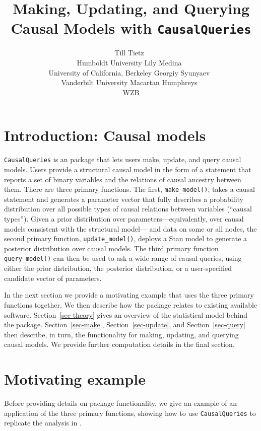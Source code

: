 \documentclass[
  11pt,
  article]{jss}
\author{Till Tietz~\orcidlink{0000-0002-2916-9059}\\Humboldt
University \And Lily Medina~\orcidlink{0009-0004-2423-524X}\\University
of California, Berkeley \AND Georgiy
Syunyaev~\orcidlink{0000-0002-4391-6313}\\Vanderbilt
University \And Macartan Humphreys~\orcidlink{0000-0001-7029-2326}\\WZB}
\title{Making, Updating, and Querying Causal Models with
\texttt{CausalQueries}}
\begin{document}
\maketitle

\section{Introduction: Causal models}\label{sec-intro}

\texttt{CausalQueries} is an  package that lets users make,
update, and query causal models. Users provide a structural causal model
in the form of a statement that reports a set of binary variables and
the relations of causal ancestry between them. There are three primary
functions. The first, \texttt{make\_model()}, takes a causal statement
and generates a parameter vector that fully describes a probability
distribution over all possible types of causal relations between
variables (``causal types''). Given a prior distribution over
parameters---equivalently, over causal models consistent with the
structural model--- and data on some or all nodes, the second primary
function, \texttt{update\_model()}, deploys a Stan
\citep{carpenter_stan_2017} model to generate a posterior distribution
over causal models. The third primary function \texttt{query\_model()}
can then be used to ask a wide range of causal queries, using either the
prior distribution, the posterior distribution, or a user-specified
candidate vector of parameters.

In the next section we provide a motivating example that uses the three
primary functions together. We then describe how the package relates to
existing available software. Section~\ref{sec-theory} gives an overview
of the statistical model behind the package. Section~\ref{sec-make},
Section~\ref{sec-update}, and Section~\ref{sec-query} then describe, in
turn, the functionality for making, updating, and querying causal
models. We provide further computation details in the final section.

\section{Motivating example}\label{motivating-example}

Before providing details on package functionality, we give an example of
an application of the three primary functions, showing how to use
\texttt{CausalQueries} to replicate the analysis in
\citetext{\citealp{chickering_clinicians_1996}; \citealp[see
also][]{humphreys_integrated_2023}}.
\end{document}
